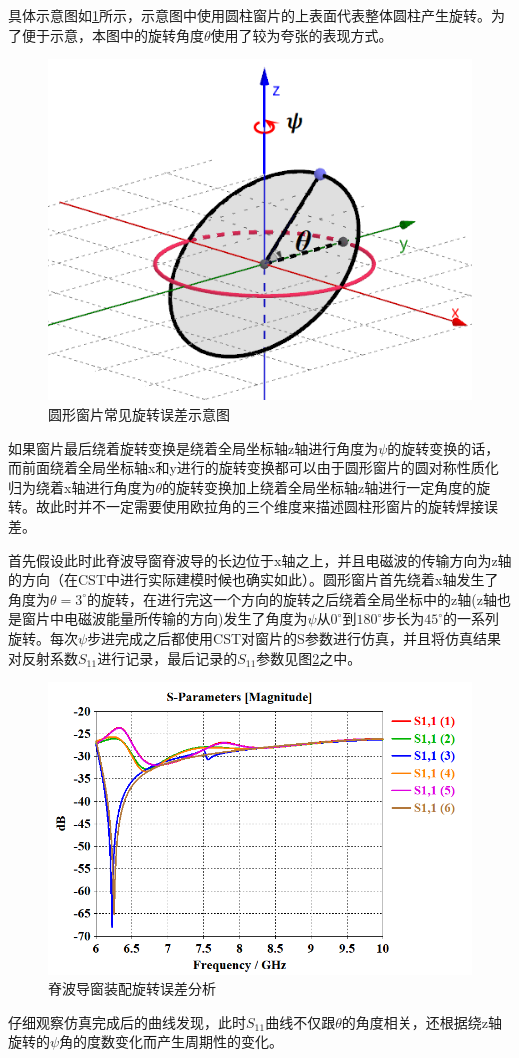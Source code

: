\documentclass[master]{thesis-uestc}
\begin{document}
具体示意图如\ref{fig:旋转示意图}所示，示意图中使用圆柱窗片的上表面代表整体圆柱产生旋转。为了便于示意，本图中的旋转角度\(\theta\)使用了较为夸张的表现方式。
\begin{figure}[!htb]
    \centering
    \includegraphics[width=0.25\linewidth]{pic/chapter5/窗片旋转角示意图.png}
    \caption{圆形窗片常见旋转误差示意图}
    \label{fig:旋转示意图}
\end{figure}
如果窗片最后绕着旋转变换是绕着全局坐标轴z轴进行角度为$\psi$的旋转变换的话，而前面绕着全局坐标轴x和y进行的旋转变换都可以由于圆形窗片的圆对称性质化归为绕着x轴进行角度为$\theta$的旋转变换加上绕着全局坐标轴z轴进行一定角度的旋转。故此时并不一定需要使用欧拉角的三个维度来描述圆柱形窗片的旋转焊接误差。

首先假设此时此脊波导窗脊波导的长边位于x轴之上，并且电磁波的传输方向为z轴的方向（在CST中进行实际建模时候也确实如此）。圆形窗片首先绕着x轴发生了角度为$\theta=3^ \circ $的旋转，在进行完这一个方向的旋转之后绕着全局坐标中的z轴(z轴也是窗片中电磁波能量所传输的方向)发生了角度为$\psi$从$0^ \circ$到$180^ \circ$步长为$45^ \circ$的一系列旋转。每次$\psi $步进完成之后都使用CST对窗片的S参数进行仿真，并且将仿真结果对反射系数$S_{11}$进行记录，最后记录的$S_{11}$参数见图\ref{fig:脊波导圆窗旋转}之中。
\begin{figure}[!htb]
    \centering
    \includegraphics[width=0.5\linewidth]{pic/chapter5/脊波导圆窗旋转.png}
    \caption{脊波导窗装配旋转误差分析}
    \label{fig:脊波导圆窗旋转}
\end{figure}
仔细观察仿真完成后的曲线发现，此时$S_{11}$曲线不仅跟\(\theta\)的角度相关，还根据绕z轴旋转的$\psi$角的度数变化而产生周期性的变化。
\end{document}
